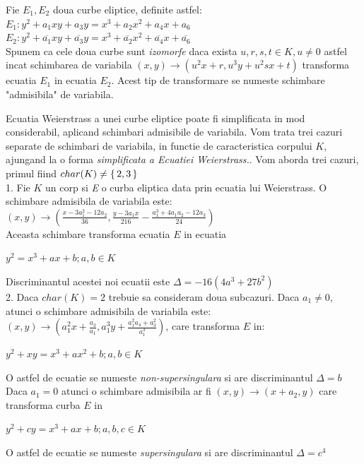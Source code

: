 \begin{dfn}
Fie $E_1, E_2$ doua curbe eliptice, definite astfel: \\
$E_1 : y^2 + a_1xy + a_3y = x^3 + a_2x^{2} + a_4x + a_6$ \\
$E_2 : y^2 + \overline{a_1}xy + \overline{a_3}y = x^3 + \overline{a_2}x^{2} + \overline{a_4}x + \overline{a_6} $ \\
Spunem ca cele doua curbe sunt \textit{izomorfe} daca exista $u,r,s,t\in K, u\neq 0$ astfel incat schimbarea de variabila $(x, y)\rightarrow (u^2x + r, u^3y + u^2sx + t)$ transforma ecuatia $E_1$ in ecuatia $E_2$. Acest tip de transformare se numeste schimbare "admisibila" de variabila.
\end{dfn}
\begin{dfn}
Ecuatia Weierstrass a unei curbe eliptice poate fi simplificata in mod considerabil, aplicand schimbari admisibile de variabila. Vom trata trei cazuri separate de schimbari de variabila, in functie de caracteristica corpului $K$, ajungand la o forma \textit{simplificata a Ecuatiei Weierstrass.}. Vom aborda trei cazuri, primul fiind $char(K) \neq \set {2,3}$ \\

  1. Fie $K$ un corp si \textit{E} o curba eliptica data prin ecuatia lui Weierstrass. O schimbare admisibila de variabila este:
$(x, y) \rightarrow (\frac{x - 3a_1^{2} - 12a_2}{36}, \frac{y-3a_1x}{216} - \frac{a_1^{3} + 4a_1a_2 - 12a_3}{24})$ \\
Aceasta schimbare transforma ecuatia $E$ in ecuatia 
\begin{center} $y^2 = x^3 + ax + b; a, b\in K$\end{center}
Discriminantul acestei noi ecuatii este $\Delta = -16(4a^3 + 27b^2)$ \\

2. Daca $char(K) = 2$ trebuie sa consideram doua subcazuri. Daca $a_1 \neq 0$, atunci o schimbare admisibila de variabila este: $(x, y) \rightarrow (a_1^2x + \frac{a_3}{a_1}, a_1^3y + \frac{a_1^2a_4 + a_3^2}{a_1^3} )$, care transforma $E$ in:
\begin{center}$y^2 + xy = x^3 + ax^2 + b; a, b\in K$\end{center}
O astfel de ecuatie se numeste \textit{non-supersingulara} si are discriminantul $\Delta = b$ \\
Daca $a_1 = 0$ atunci o schimbare admisibila ar fi $(x, y)\rightarrow (x + a_2, y)$ care transforma curba $E$ in
\begin{center} $y^2 + cy = x^3 + ax + b; a,b,c\in K$ \end{center}
O astfel de ecuatie se numeste \textit{supersingulara} si are discriminantul $\Delta = c^4$
\\


\end{dfn}
